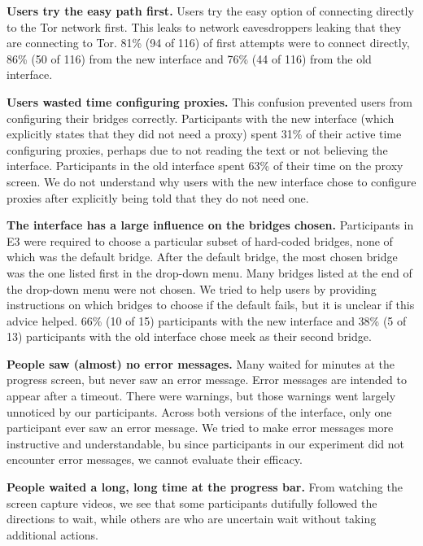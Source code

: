 \documentclass[USenglish,oneside,twocolumn]{article}
\begin{document}
\begin{description}
\item {\bfseries Users try the easy path first.} Users try the easy option of connecting directly to the Tor network first. This leaks to network eavesdroppers leaking that they are connecting to Tor.  81\% (94 of 116) of first attempts were to connect directly, 86\% (50 of 116) from the new interface and 76\% (44 of 116) from the old interface.

\item {\bfseries Users wasted time configuring proxies.} This confusion prevented users from configuring their bridges correctly. Participants with the new interface (which explicitly states that they did not need a proxy) spent 31\% of their active time configuring proxies, perhaps due to not reading the text or not believing the interface. Participants in the old interface spent 63\% of their time on the proxy screen. We do not understand why users with the new interface chose to configure proxies after explicitly being told that they do not need one.

\item {\bfseries The interface has a large influence on the bridges chosen.}
Participants in E3 were required to choose a particular subset of hard-coded bridges, none of which was the default bridge. After the default bridge, the most chosen bridge was the one listed first in the drop-down menu. Many bridges listed at the end of the drop-down menu were not chosen. We tried to help users by providing instructions on which bridges to choose if the default fails, but it is unclear if this advice helped. 66\% (10 of 15) participants with the new interface and 38\% (5 of 13) participants with the old interface chose meek as their second bridge.

\item {\bfseries People saw (almost) no error messages.} Many waited for minutes at the progress screen, but never saw an error message. Error messages are intended to appear after a timeout. There were warnings, but those warnings went largely unnoticed by our participants. Across both versions of the interface, only one participant ever saw an error message. We tried to make error messages more instructive and understandable, bu since participants in our experiment did not encounter error messages, we cannot evaluate their efficacy. 

\item {\bfseries People waited a long, long time at the progress bar.}
From watching the screen capture videos, we see that some participants dutifully followed the directions to wait, while others are who are uncertain wait without taking additional actions.
\end{description} 
\end{document}
